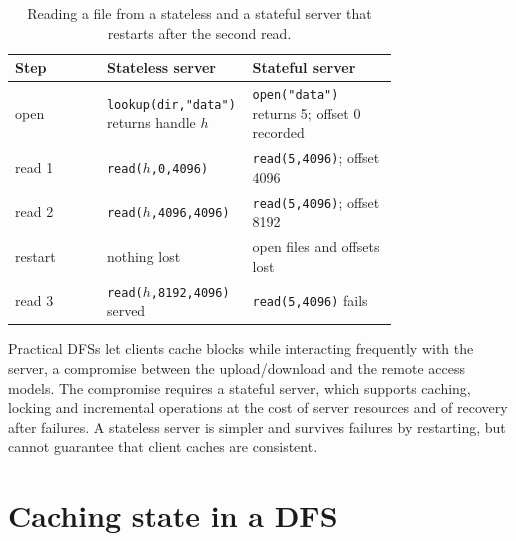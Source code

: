 \documentclass[../main.tex]{subfiles}
\begin{document}
\begin{table}[htbp]
  \centering
  \caption{Reading a file from a stateless and a stateful server that
    restarts after the second read.}
  \label{tab:l14-state-ex}
  \small
  \begin{tabular}{@{}l>{\raggedright\arraybackslash}p{0.38\linewidth}>{\raggedright\arraybackslash}p{0.38\linewidth}@{}}
    \toprule
    Step & Stateless server & Stateful server \\
    \midrule
    open & \texttt{lookup(dir,"data")} returns handle $h$ &
      \texttt{open("data")} returns 5; offset 0 recorded \\
    read 1 & \texttt{read($h$,0,4096)} & \texttt{read(5,4096)}; offset
      4096 \\
    read 2 & \texttt{read($h$,4096,4096)} & \texttt{read(5,4096)}; offset
      8192 \\
    restart & nothing lost & open files and offsets lost \\
    read 3 & \texttt{read($h$,8192,4096)} served & \texttt{read(5,4096)}
      fails \\
    \bottomrule
  \end{tabular}
\end{table}

\begin{keypoint}
  Practical DFSs let clients cache blocks while interacting frequently
  with the server, a compromise between the upload/download and the remote
  access models.  The compromise requires a stateful server, which
  supports caching, locking and incremental operations at the cost of
  server resources and of recovery after failures.  A stateless server is
  simpler and survives failures by restarting, but cannot guarantee that
  client caches are consistent.
\end{keypoint}

\section{Caching state in a DFS}
\label{sec:l14-caching}
\end{document}
